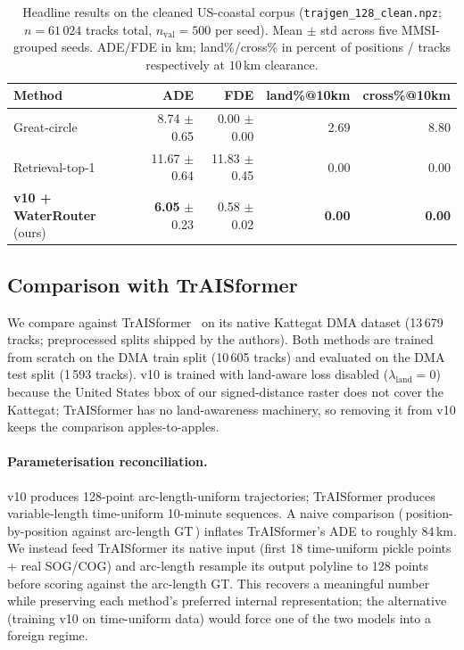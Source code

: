 \documentclass[11pt]{article}
\begin{document}
\begin{table}[t]
  \centering
  \small
  \caption{Headline results on the cleaned US-coastal corpus
  (\texttt{trajgen\_128\_clean.npz}; $n=61\,024$ tracks total,
  $n_{\text{val}}=500$ per seed). Mean $\pm$ std across five MMSI-grouped
  seeds. ADE/FDE in km; land\%/cross\% in percent of positions / tracks
  respectively at $10$\,km clearance.}
  \label{tab:main_us}
  \begin{tabular}{lrrrr}
    \toprule
    Method               & ADE & FDE & land\%@10km & cross\%@10km \\
    \midrule
    Great-circle         & 8.74 $\pm$ 0.65  & 0.00 $\pm$ 0.00 & 2.69 & 8.80 \\
    Retrieval-top-1      & 11.67 $\pm$ 0.64 & 11.83 $\pm$ 0.45 & 0.00 & 0.00 \\
    \textbf{v10 + WaterRouter} (ours) & \textbf{6.05} $\pm$ 0.23 & 0.58 $\pm$ 0.02 & \textbf{0.00} & \textbf{0.00} \\
    \bottomrule
  \end{tabular}
\end{table}

\subsection{Comparison with TrAISformer}
\label{sec:traisformer}

We compare against TrAISformer~\citep{traisformer2024} on its native Kattegat
DMA dataset (13\,679 tracks; preprocessed splits shipped by the authors).
Both methods are trained from scratch on the DMA train split (10\,605 tracks)
and evaluated on the DMA test split (1\,593 tracks). v10 is trained with
land-aware loss disabled ($\lambda_{\text{land}} = 0$) because the United
States bbox of our signed-distance raster does not cover the Kattegat;
TrAISformer has no land-awareness machinery, so removing it from v10 keeps
the comparison apples-to-apples.

\paragraph{Parameterisation reconciliation.} v10 produces 128-point
arc-length-uniform trajectories; TrAISformer produces variable-length
time-uniform 10-minute sequences. A naive comparison
(\,position-by-position against arc-length GT\,) inflates TrAISformer's ADE
to roughly $84$\,km. We instead feed TrAISformer its native input
(first 18 time-uniform pickle points + real SOG/COG) and arc-length resample
its output polyline to 128 points before scoring against the arc-length GT.
This recovers a meaningful number while preserving each method's preferred
internal representation; the alternative (training v10 on time-uniform data)
would force one of the two models into a foreign regime.
\end{document}

